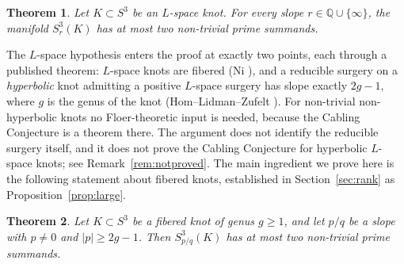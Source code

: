 \documentclass[11pt]{article}
\newcommand{\Q}{\mathbb Q}
\newcommand{\Surg}[2]{S^3_{#1}(#2)}
\newtheorem{theorem}{Theorem}[section]
\theoremstyle{definition}
\theoremstyle{remark}
\begin{document}
\begin{theorem}\label{thm:main}
Let \(K\subset S^3\) be an \(L\)-space knot. For every slope
\(r\in\Q\cup\{\infty\}\), the manifold \(\Surg{r}{K}\) has at most two
non-trivial prime summands.
\end{theorem}

The \(L\)-space hypothesis enters the proof at exactly two points, each
through a published theorem: \(L\)-space knots are fibered (Ni
\cite{Ni2007}), and a reducible surgery on a \emph{hyperbolic} knot
admitting a positive \(L\)-space surgery has slope exactly \(2g-1\), where
\(g\) is the genus of the knot (Hom--Lidman--Zufelt \cite[Theorem~1.3]{HLZ2015}).
For non-trivial non-hyperbolic knots no Floer-theoretic input is needed,
because the Cabling Conjecture is a theorem there. The argument does not identify
the reducible surgery itself, and it does not prove the Cabling
Conjecture for hyperbolic \(L\)-space knots; see Remark~\ref{rem:notproved}.
The main ingredient we prove here is the following statement about
fibered knots, established in Section~\ref{sec:rank} as
Proposition~\ref{prop:large}.

\begin{theorem}\label{thm:fibered}
Let \(K\subset S^3\) be a fibered knot of genus \(g\geq1\), and let
\(p/q\) be a slope with \(p\neq0\) and \(|p|\geq 2g-1\). Then
\(\Surg{p/q}{K}\) has at most two non-trivial prime summands.
\end{theorem}
\end{document}
